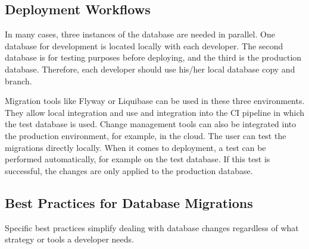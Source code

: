 \subsection{Deployment Workflows}
%
In many cases, three instances of the database are needed in parallel. One database for development is located locally with each developer. The second database is for testing purposes before deploying, and the third is the production database. Therefore, each developer should use his/her local database copy and branch.

Migration tools like Flyway or Liquibase can be used in these three environments. They allow local integration and use and integration into the CI pipeline in which the test database is used. Change management tools can also be integrated into the production environment, for example, in the cloud. The user can test the migrations directly locally. When it comes to deployment, a test can be performed automatically, for example on the test database. If this test is successful, the changes are only applied to the production database.

\subsection{Best Practices for Database Migrations \label{best_practices}}%
%
Specific best practices simplify dealing with database changes regardless of what strategy or tools a developer needs.

